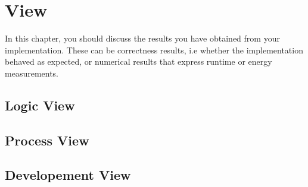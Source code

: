\chapter{View}
In this chapter, you should discuss the results you have obtained from your implementation.
These can be correctness results, i.e whether the implementation behaved as expected, or numerical results that express runtime or energy measurements.

\section{Logic View}

\section{Process View}

\section{Developement View}